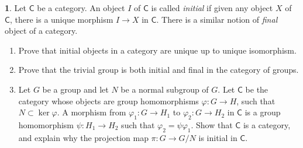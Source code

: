 \documentclass[12pt]{article}
\theoremstyle{definition}
\newtheorem{ex}{}
\begin{document}
\begin{ex}
	Let $\mathsf{C}$ be a category.
	An object $I$ of $\mathsf{C}$ is called \textit{initial} if given any object $X$ of $\mathsf{C}$, there is a unique morphism $I \to X$ in $\mathsf{C}$.
	There is a similar notion of \textit{final} object of a category.
	\begin{enumerate}[label=(\alph*)]
		\item Prove that initial objects in a category are unique up to unique isomorphism.
		\item Prove that the trivial group is both initial and final in the category of groups.
		\item Let $G$ be a group and let $N$ be a normal subgroup of $G$.
		      Let $\mathsf{C}$ be the category whose objects are group homomorphisms $\varphi : G \to H$, such that $N \subset \ker \varphi$.
		      A morphism from $\varphi_1 : G \to H_1$ to $\varphi_2 : G \to H_2$ in $\mathsf{C}$ is a group homomorphism $\psi : H_1 \to H_2$ such that $\varphi_2 = \psi\varphi_1$.
		      Show that $\mathsf{C}$ is a category, and explain why the projection map $\pi : G \to G / N$ is initial in $\mathsf{C}$.
	\end{enumerate}
\end{ex}
\end{document}
